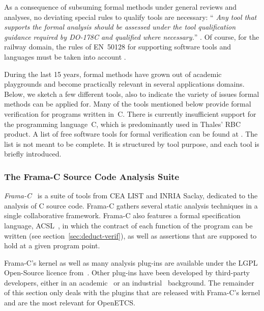 \documentclass{template/openetcs_report}
\newcommand{\cxx}{C\nolinebreak[4]\hspace{-.05em}\raisebox{.3ex}{\footnotesize\bf ++}\xspace}
\begin{document}
As a consequence of subsuming formal methods under general reviews and
analyses, no deviating special rules to qualify tools are necessary:
``{\em
Any tool that supports the formal analysis should be assessed under
the tool qualification
guidance required by DO-178C and qualified where necessary.}''
\cite[FM.1.6.2]{DO-333}.
Of course, for the railway domain, the rules of EN~50128 for supporting
software tools and languages must be taken into account
\cite[Section~6.7]{en50128}.

During the last 15 years, formal methods have grown out of academic
playgrounds and become practically relevant in several applications
domains.
Below, we sketch a few different tools, also to indicate the variety
of issues formal methods can be applied for.
Many of the tools mentioned below provide formal verification for programs
written in~C.
There is currently insufficient support for the programming language~\cxx,
which is predominantly used in Thales' RBC product.
%
A list of free software tools for formal verification
can be found at \cite{gulliver}.
%
The list is not meant to be complete.
%
It is structured by tool purpose, and each tool is briefly
introduced.

\subsubsection{The Frama-C Source Code Analysis Suite}
\label{sec:Frama-C}

{\em Frama-C}~\cite{Cuoq.2012} is a suite of tools 
from CEA LIST and INRIA Saclay, dedicated to the analysis of C source code.
Frama-C gathers several static analysis techniques in a single
collaborative framework. Frama-C also features a formal specification language,
ACSL~\cite{ACSL}, in which the contract of each function of the program can
be written (see section~\ref{sec:deduct-verif}), as well as assertions that
are supposed to hold at a given program point.

Frama-C's kernel as well as many analysis plug-ins are available under the
LGPL Open-Source licence from~\cite{frama-c}. Other plug-ins have been
developed by third-party developers, either in an academic~\cite{Bouajjani.2011}
or an industrial~\cite{Ledinot.Pariente.2010} background. The remainder of this
section only deals with the plugins that are released with Frama-C's kernel and
are the most relevant for OpenETCS.
\end{document}
